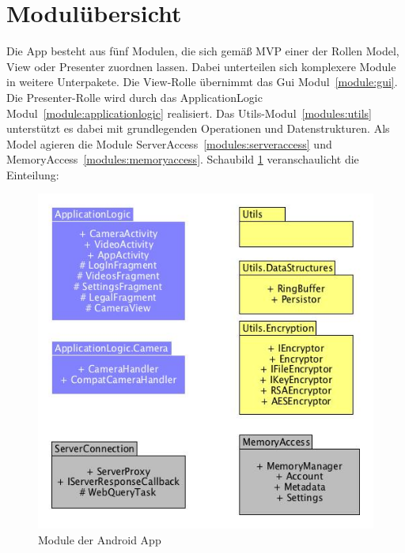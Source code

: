 \section{Modulübersicht}
Die App besteht aus fünf Modulen, die sich gemäß MVP einer der Rollen Model, View oder Presenter zuordnen lassen. Dabei unterteilen sich komplexere Module in weitere Unterpakete. Die View-Rolle übernimmt das Gui Modul~\eqref{module:gui}. Die Presenter-Rolle wird durch das ApplicationLogic Modul~\eqref{module:applicationlogic} realisiert. Das Utils-Modul~\eqref{modules:utils} unterstützt es dabei mit grundlegenden Operationen und Datenstrukturen. Als Model agieren die Module ServerAccess~\eqref{modules:serveraccess} und MemoryAccess~\eqref{modules:memoryaccess}. Schaubild \ref{fig:modules_overview} veranschaulicht die Einteilung:
\begin{figure}[ht]
	\centering
\includegraphics[width=1\textwidth]{./resources/Diagramme/App/modules_overview.jpg}
\caption{Module der Android App}
	\label{fig:modules_overview}
\end{figure}




